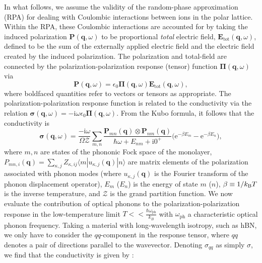 \documentclass[aps,prb,twocolumn,
	           groupedaddress,superscriptaddress,
               amsfonts,amssymb,amsmath,floatfix,
	           citeautoscript]{revtex4-1}
\newcommand{\iu}{\mathrm{i}}
\newcommand{\e}{\mathrm{e}}
\begin{document}
In what follows, we assume the validity of the random-phase approximation (RPA) for dealing with Coulombic interactions between ions in the polar lattice. Within the RPA, these Coulombic interactions are accounted for by taking the induced polarization $\mathbf{P}(\mathbf{q},\omega)$ to be proportional \emph{total} electric field, $\mathbf{E}_{\mathrm{tot}}(\mathbf{q},\omega)$, defined to be the sum of the externally applied electric field and the electric field created by the induced polarization. The polarization and total-field are connected by the polarization-polarization response (tensor) function  $\boldsymbol{\Pi}(\mathbf{q},\omega)$ via
\begin{equation}
\mathbf{P}(\mathbf{q},\omega)  = \epsilon_0\boldsymbol{\Pi}(\mathbf{q},\omega)\mathbf{E}_{\mathrm{tot}}(\mathbf{q},\omega),
\end{equation}
where boldfaced quantities refer to vectors or tensors as appropriate. The polarization-polarization response function is related to the conductivity via the relation $\boldsymbol{\sigma}(\mathbf{q},\omega) = -\iu\omega\epsilon_0\boldsymbol{\Pi}(\mathbf{q},\omega)$. From the Kubo formula, it follows that the conductivity is
\begin{equation}\label{eq:2dsusceptibility}
    \boldsymbol{\sigma}(\mathbf{q},\omega) =  \frac{-\iu \omega}{ \Omega\mathcal{Z}}\sum\limits_{m,n}\frac{\mathbf{P}_{mn}(\mathbf{q})\otimes\mathbf{P}_{nm}(\mathbf{q})}{\hbar\omega + E_{nm}+\iu 0^+}\Big(\e^{-\beta E_m}-\e^{-\beta E_n} \Big),
\end{equation}
where $m,n$ are states of the phononic Fock space of the monolayer, $P_{mn,i}(\mathbf{q}) = \sum_{\kappa,j}Z_{\kappa,ij}\langle m | u_{\kappa,j}(\mathbf{q}) | n \rangle$ are matrix elements of the polarization associated with phonon modes (where $u_{\kappa,j}(\mathbf{q})$ is the Fourier transform of the phonon displacement operator), $E_{m}$ ($E_n$) is the energy of state $m$ ($n$), $\beta \equiv 1/k_{\text{\textsc{B}}}T$ is the inverse temperature, and $\mathcal{Z}$ is the grand partition function. We now evaluate the contribution of optical phonons to the polarization-polarization response in the low-temperature limit $T << \frac{\hbar\omega_{\mathrm{ph}}}{k_B}$ with $\omega_{\mathrm{ph}}$ a characteristic optical phonon frequency.  Taking a material with long-wavelength isotropy, such as hBN, we only have to consider the $qq$-component in the response tensor, where $qq$ denotes a pair of directions parallel to the wavevector. Denoting $\sigma_{qq}$ as simply $\sigma$, we find that the conductivity is given by \cite{rivera2018ab}: 
\end{document}
